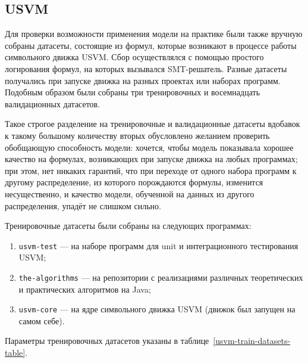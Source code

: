 \subsection{USVM}


Для проверки возможности применения модели на практике были также вручную собраны датасеты, состоящие из формул, которые возникают в процессе работы символьного движка USVM. Сбор осуществлялся с помощью простого логирования формул, на которых вызывался SMT-решатель. Разные датасеты получались при запуске движка на разных проектах или наборах программ. Подобным образом были собраны три тренировочных и восемнадцать валидационных датасетов.

Такое строгое разделение на тренировочные и валидационные датасеты вдобавок к такому большому количеству вторых обусловлено желанием проверить обобщающую способность модели: хочется, чтобы модель показывала хорошее качество на формулах, возникающих при запуске движка на любых программах; при этом, нет никаких гарантий, что при переходе от одного набора программ к другому распределение, из которого порождаются формулы, изменится несущественно, и качество модели, обученной на данных из другого распределения, упадёт не слишком сильно.

Тренировочные датасеты были собраны на следующих программах:

\begin{enumerate}
    \item \texttt{usvm-test} --- на наборе программ для unit и интеграционного тестирования USVM;
    \item \texttt{the-algorithms} --- на репозитории с реализациями различных теоретических и практических алгоритмов на Java;
    \item \texttt{usvm-core} --- на ядре символьного движка USVM (движок был запущен на самом себе).
\end{enumerate}

Параметры тренировочных датасетов указаны в таблице~\ref{usvm-train-datasets-table}.


